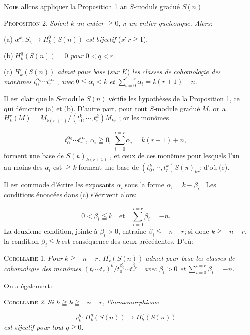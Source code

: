Nous allons appliquer la Proposition 1 au $S$-module gradué $S(n)$:

\textsc{Proposition 2.} \textit{Soient $k$ un entier} $\geqq 0$, \textit{$n$ un entier quelconque. Alors}:

(a) $\alpha^k : S_n \to H_k^0(S(n))$ \textit{est bijectif} (\textit{si} $r \geqq 1$).

(b) $H_k^q(S(n)) = 0$ \quad \textit{pour} $0 < q < r$.

(c) $H_k^r(S(n))$ \textit{admet pour base} (\textit{sur} $K$) \textit{les classes de cohomologie des monômes} $t_0^{\alpha_0} \cdots t_r^{\alpha_r}$ , \textit{avec} $0 \leqq \alpha_i < k$ \textit{et} $\sum_{i=0}^{i=r} \alpha_i = k(r + 1) + n$.

Il est clair que le $S$-module $S(n)$ vérifie les hypothèses de la Proposition 1, ce qui démontre (a) et (b). D'autre part, pour tout $S$-module gradué $M$, on a $H_k^r(M) = M_{k(r+1)}/(t_0^k , \cdots , t_r^k)M_{kr}$ ; or les monômes

\begin{equation*}
t_0^{\alpha_0} \cdots t_r^{\alpha_r} , \ \alpha_i \geqq 0, \ \sum_{i=0}^{i=r} \alpha_i = k(r + 1) + n,
\end{equation*}
forment une base de $S(n)_{k(r+1)}$ , et ceux de ces monômes pour lesquels l'un au moins des $\alpha_i$ est $\geqq k$ forment une base de $(t_0^k , \cdots , t_r^k)S(n)_{kr}$; d'où (c).

Il est commode d'écrire les exposants $\alpha_i$ sous la forme $\alpha_i = k - \beta_i$ . Les conditions énoncées dans (c) s'écrivent alors:

\begin{equation*}
0 < \beta_i \leqq k \quad \mathrm{et} \quad \sum_{i=0}^{i=r} \beta_i = -n.
\end{equation*}
La deuxième condition, jointe à $\beta_i > 0$, entraîne $\beta_i \leqq -n - r$; si donc $k \geqq -n - r$, la condition $\beta_i \leqq k$ est conséquence des deux précédentes. D'où:

\textsc{Corollaire 1.} \textit{Pour $k \geqq -n - r$, $H_k^r(S(n))$ admet pour base les classes de cohomologie des monômes $(t_0 \cdots t_r)^k/t_0^{\beta_0} \cdots t_r^{\beta_r}$ , avec $\beta_i > 0$ et $\sum_{i=0}^{i=r} \beta_i = -n$.}

On a également:

\textsc{Corollaire 2.} \textit{Si $h \geqq k \geqq -n - r$, l'homomorphisme}

\begin{equation*}
\rho_k^h : H_k^q(S(n)) \longrightarrow H_h^q(S(n))
\end{equation*}
\textit{est bijectif pour tout $q \geqq 0$.}

